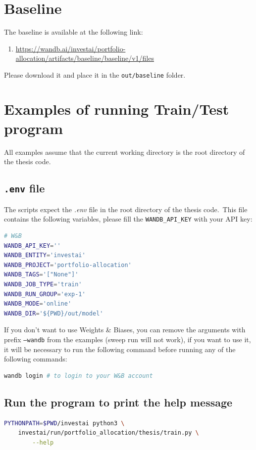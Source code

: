 \documentclass[../xlapes02]{subfiles}
\begin{document}
    \section{Baseline}\label{sec:baseline}
    The baseline is available at the following link:
    \begin{enumerate}
        \item \url{https://wandb.ai/investai/portfolio-allocation/artifacts/baseline/baseline/v1/files}
    \end{enumerate}
    Please download it and place it in the \texttt{out/baseline} folder.

    \section{Examples of running Train/Test program}\label{sec:examples-of-running-train/test-program}
    All examples assume that the current working directory is the root directory of the thesis code.

    \subsection{\texttt{.env} file}\label{subsec:texttt{.env}-file}
    The scripts expect the \emph{.env} file in the root directory of the thesis code.\ This file contains the following variables, please fill the \texttt{WANDB\_API\_KEY} with your API key:
    \begin{lstlisting}[language=bash,label={lst:env-file}]
# W&B
WANDB_API_KEY=''
WANDB_ENTITY='investai'
WANDB_PROJECT='portfolio-allocation'
WANDB_TAGS='["None"]'
WANDB_JOB_TYPE='train'
WANDB_RUN_GROUP='exp-1'
WANDB_MODE='online'
WANDB_DIR='${PWD}/out/model'
    \end{lstlisting}
    If you don't want to use Weights \& Biases, you can remove the arguments with prefix \texttt{--wandb} from the examples (sweep run will not work), if you want to use it, it will be necessary to run the following command before running any of the following commands:
    \begin{lstlisting}[language=bash,label={lst:wandb-login}]
wandb login # to login to your W&B account
    \end{lstlisting}

    \subsection{Run the program to print the help message}\label{subsec:run-the-program-to-print-the-help-message}
    \begin{lstlisting}[language=bash,label={lst:help}]
PYTHONPATH=$PWD/investai python3 \
    investai/run/portfolio_allocation/thesis/train.py \
        --help
    \end{lstlisting}
\end{document}
